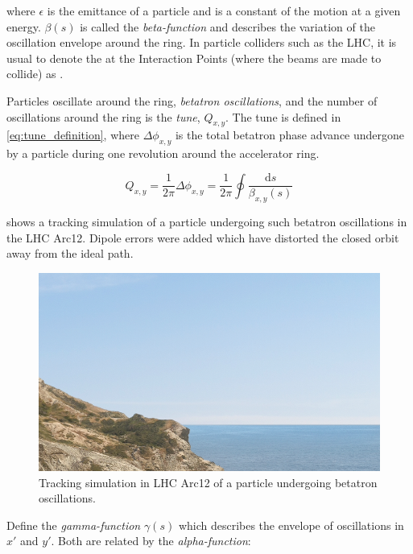 where $\epsilon$ is the emittance of a particle and is a constant of the motion at a given energy.
$\beta(s)$ is called the \emph{beta-function} and describes the variation of the oscillation envelope around the ring. 
In particle colliders such as the LHC, it is usual to denote the \betafunctions at the Interaction Points (where the beams are made to collide) as \betastar.
\bigbreak

Particles oscillate around the ring, \emph{betatron oscillations}, and the number of oscillations around the ring is the \emph{tune}, $Q_{x,y}$.
The tune is defined in \cref{eq:tune_definition}, where $\Delta \phi_{x, y}$ is the total betatron phase advance undergone by a particle during one revolution around the accelerator ring.
\bigbreak

\begin{equation}
    Q_{x, y} = \frac{1}{2 \pi} \Delta \phi_{x, y} = \frac{1}{2 \pi} \oint \frac{\mathrm{d}s}{\beta_{x, y}(s)}
    \label{eq:tune_definition}
\end{equation}

 shows a tracking simulation of a particle undergoing such betatron oscillations in the LHC Arc12.
Dipole errors were added which have distorted the closed orbit away from the ideal path.
\bigbreak

\begin{figure}[!htb]
    \begin{center}
    \includegraphics[width = 0.7\linewidth]{Figures/placeholder.png}
    \caption{Tracking simulation in LHC Arc12 of a particle undergoing betatron oscillations.}
    \label{figure:particle_trajectories}
    \end{center}
\end{figure}

Define the \emph{gamma-function} $\gamma(s)$ which describes the envelope of oscillations in $x\prime$ and $y\prime$.
Both are related by the \emph{alpha-function}:
\bigbreak

